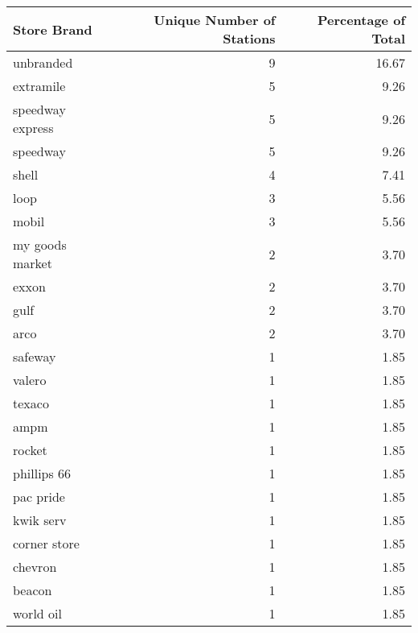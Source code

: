 \begin{tabular}{lrr}
\toprule
\textbf{Store Brand} & \textbf{Unique Number of Stations} & \textbf{Percentage of Total} \\
\midrule
unbranded & 9 & 16.67 \\
extramile & 5 & 9.26 \\
speedway express & 5 & 9.26 \\
speedway & 5 & 9.26 \\
shell & 4 & 7.41 \\
loop & 3 & 5.56 \\
mobil & 3 & 5.56 \\
my goods market & 2 & 3.70 \\
exxon & 2 & 3.70 \\
gulf & 2 & 3.70 \\
arco & 2 & 3.70 \\
safeway & 1 & 1.85 \\
valero & 1 & 1.85 \\
texaco & 1 & 1.85 \\
ampm & 1 & 1.85 \\
rocket & 1 & 1.85 \\
phillips 66 & 1 & 1.85 \\
pac pride & 1 & 1.85 \\
kwik serv & 1 & 1.85 \\
corner store & 1 & 1.85 \\
chevron & 1 & 1.85 \\
beacon & 1 & 1.85 \\
world oil & 1 & 1.85 \\
\bottomrule
\end{tabular}
